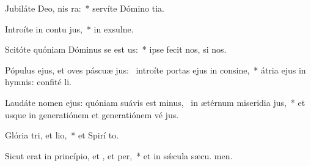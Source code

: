 \item Jubiláte Deo, nis ra:~* servíte Dómino  tia.
\item Introíte in contu jus,~* in exsulne.
\item Scitóte quóniam Dóminus se est us:~* ipse fecit nos,   si nos.
\item Pópulus ejus, et oves páscuæ jus:~\pscross{} introíte portas ejus in consine,~* átria ejus in hymnis: confité li.
\item Laudáte nomen ejus: quóniam suávis est minus,~\pscross{} in ætérnum miseridia jus,~* et usque in generatiónem et generatiónem vé jus.
\item Glória tri, et lio,~* et Spirí to.
\item Sicut erat in princípio, et , et per,~* et in sǽcula sæcu. men.
